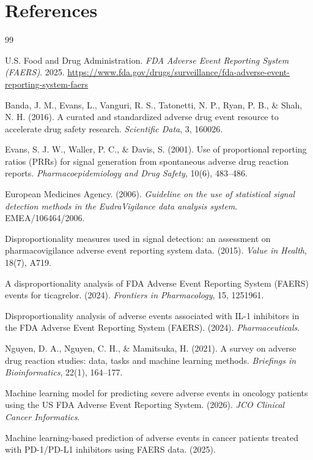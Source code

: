 \documentclass[12pt,a4paper]{article}
\begin{document}
\section*{References}

\begin{thebibliography}{99}

U.S. Food and Drug Administration. \textit{FDA Adverse Event Reporting System (FAERS)}. 2025. \url{https://www.fda.gov/drugs/surveillance/fda-adverse-event-reporting-system-faers}

Banda, J. M., Evans, L., Vanguri, R. S., Tatonetti, N. P., Ryan, P. B., \& Shah, N. H. (2016). A curated and standardized adverse drug event resource to accelerate drug safety research. \textit{Scientific Data}, 3, 160026.

Evans, S. J. W., Waller, P. C., \& Davis, S. (2001). Use of proportional reporting ratios (PRRs) for signal generation from spontaneous adverse drug reaction reports. \textit{Pharmacoepidemiology and Drug Safety}, 10(6), 483--486.

European Medicines Agency. (2006). \textit{Guideline on the use of statistical signal detection methods in the EudraVigilance data analysis system}. EMEA/106464/2006.

Disproportionality measures used in signal detection: an assessment on pharmacovigilance adverse event reporting system data. (2015). \textit{Value in Health}, 18(7), A719.

A disproportionality analysis of FDA Adverse Event Reporting System (FAERS) events for ticagrelor. (2024). \textit{Frontiers in Pharmacology}, 15, 1251961.

Disproportionality analysis of adverse events associated with IL-1 inhibitors in the FDA Adverse Event Reporting System (FAERS). (2024). \textit{Pharmaceuticals}.

Nguyen, D. A., Nguyen, C. H., \& Mamitsuka, H. (2021). A survey on adverse drug reaction studies: data, tasks and machine learning methods. \textit{Briefings in Bioinformatics}, 22(1), 164--177.

Machine learning model for predicting severe adverse events in oncology patients using the US FDA Adverse Event Reporting System. (2026). \textit{JCO Clinical Cancer Informatics}.

Machine learning-based prediction of adverse events in cancer patients treated with PD-1/PD-L1 inhibitors using FAERS data. (2025).


\end{thebibliography}
\end{document}
